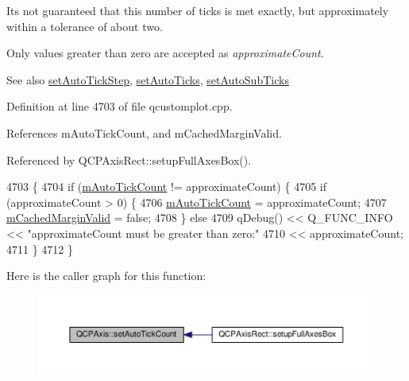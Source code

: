 It\textquotesingle{}s not guaranteed that this number of ticks is met exactly, but approximately within a tolerance of about two.

Only values greater than zero are accepted as {\itshape approximate\+Count}.

\begin{DoxySeeAlso}{See also}
\hyperlink{class_q_c_p_axis_a99fe77b034e06f5b723995beab96e741}{set\+Auto\+Tick\+Step}, \hyperlink{class_q_c_p_axis_ae867c23d3a6a7bd4d09cc66c5d018f63}{set\+Auto\+Ticks}, \hyperlink{class_q_c_p_axis_adcbdec7a60054b88571e89599f4a45bf}{set\+Auto\+Sub\+Ticks} 
\end{DoxySeeAlso}


Definition at line 4703 of file qcustomplot.\+cpp.



References m\+Auto\+Tick\+Count, and m\+Cached\+Margin\+Valid.



Referenced by Q\+C\+P\+Axis\+Rect\+::setup\+Full\+Axes\+Box().


\begin{DoxyCode}
4703                                                    \{
4704   \textcolor{keywordflow}{if} (\hyperlink{class_q_c_p_axis_a499fbb67111e4b204738f6c1aa28d842}{mAutoTickCount} != approximateCount) \{
4705     \textcolor{keywordflow}{if} (approximateCount > 0) \{
4706       \hyperlink{class_q_c_p_axis_a499fbb67111e4b204738f6c1aa28d842}{mAutoTickCount} = approximateCount;
4707       \hyperlink{class_q_c_p_axis_a2cde37b6e385f47e11322df4ac1b0e9b}{mCachedMarginValid} = \textcolor{keyword}{false};
4708     \} \textcolor{keywordflow}{else}
4709       qDebug() << Q\_FUNC\_INFO << \textcolor{stringliteral}{"approximateCount must be greater than zero:"}
4710                << approximateCount;
4711   \}
4712 \}
\end{DoxyCode}


Here is the caller graph for this function\+:\nopagebreak
\begin{figure}[H]
\begin{center}
\leavevmode
\includegraphics[width=350pt]{class_q_c_p_axis_a7c7111cbeac9ec5fcb40f93a1ef51a0b_icgraph}
\end{center}
\end{figure}


